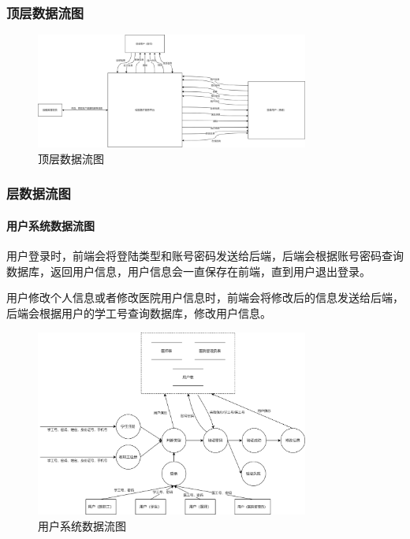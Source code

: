 \documentclass{article}
\begin{document}
\subsubsection{顶层数据流图}

\begin{figure}[H]
    \centering
    \includegraphics[width=0.8\textwidth]{images/all_dataflow.png}
    \caption{顶层数据流图}
\end{figure}

\subsubsection{层数据流图}

\paragraph{用户系统数据流图}

用户登录时，前端会将登陆类型和账号密码发送给后端，后端会根据账号密码查询数据库，返回用户信息，用户信息会一直保存在前端，直到用户退出登录。

用户修改个人信息或者修改医院用户信息时，前端会将修改后的信息发送给后端，后端会根据用户的学工号查询数据库，修改用户信息。

\begin{figure}[H]
    \centering
    \includegraphics[width=0.8\textwidth]{images/user_dataflow.png}
    \caption{用户系统数据流图}
\end{figure}
\end{document}
